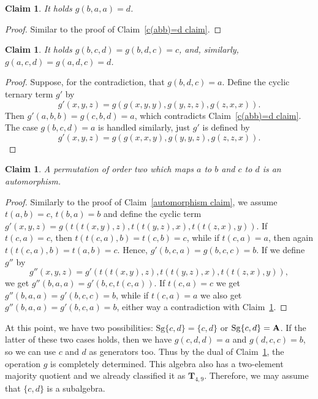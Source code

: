 \documentclass[11pt]{amsart}
\newcommand{\m}[1]{\mathbf{\uppercase{#1}}}
\theoremstyle{definition}
\theoremstyle{remark}
\theoremstyle{plain}
\newtheorem{claim}[thm]{Claim}
\begin{document}
\begin{enumerate}[wide, labelindent=0pt]
\begin{enumerate}[wide, labelindent=0pt]
    \begin{claim}\label{g(baa)=d}
    It holds $g(b,a,a)=d$.
    \end{claim}
    \begin{proof}
    Similar to the proof of Claim~\ref{c(abb)=d claim}.
    \end{proof}

    \begin{claim}\label{c(bde)=d}
    It holds $g(b,c,d)=g(b,d,c)=c$, and, similarly, $g(a,c,d)=g(a,d,c)=d$.
    \end{claim}
    \begin{proof}
    Suppose, for the contradiction, that $g(b,d,c)=a$. Define the cyclic ternary term $g'$ by $$g'(x,y,z)=g(g(x,y,y),g(y,z,z),g(z,x,x)).$$ Then $g'(a,b,b)=g(c,b,d)=a$, which contradicts Claim~\ref{c(abb)=d claim}. The case $g(b,c,d)=a$ is handled similarly, just $g'$ is defined by $$g'(x,y,z)=g(g(x,x,y),g(y,y,z),g(z,z,x)).$$
    \end{proof}

    \begin{claim}
    A permutation of order two which maps $a$ to $b$ and $c$ to $d$ is an automorphism.  
    \end{claim}
    \begin{proof}
    Similarly to the proof of Claim~\ref{automorphism claim}, we assume $t(a,b)=c$, $t(b,a)=b$ and define the cyclic term $g'(x,y,z)=g(t(t(x,y),z),t(t(y,z),x),t(t(z,x),y))$. If $t(c,a)=c$, then $t(t(c,a),b)=t(c,b)=c$, while if $t(c,a)=a$, then again $t(t(c,a),b)=t(a,b)=c$. Hence, $g'(b,c,a)=g(b,c,c)=b$. If we define $g''$ by $$g''(x,y,z)=g'(t(t(x,y),z),t(t(y,z),x),t(t(z,x),y)),$$ we get $g''(b,a,a)=g'(b,c,t(c,a))$. If $t(c,a)=c$ we get $g''(b,a,a)=g'(b,c,c)=b$, while if $t(c,a)=a$ we also get $g''(b,a,a)=g'(b,c,a)=b$, either way a contradiction with Claim~\ref{g(baa)=d}.
    \end{proof}

    At this point, we have two possibilities: $\mathrm{Sg}\{c,d\}=\{c,d\}$ or $\mathrm{Sg}\{c,d\}=\m a$. If the latter of these two cases holds, then we have $g(c,d,d)=a$ and $g(d,c,c)=b$, so we can use $c$ and $d$ as generators too. Thus by the dual of Claim~\ref{c(bde)=d}, the operation $g$ is completely determined. This algebra also has a two-element majority quotient and we already classified it as $\mathbf{T}_{4,9}$. Therefore, we may assume that $\{c,d\}$ is a subalgebra.
    

\end{enumerate}
\end{enumerate}
\end{document}
